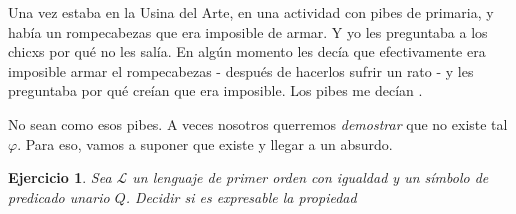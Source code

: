 \documentclass[10pt,a4paper]{article}
\def\l{\mathcal{L}}
\newtheorem{xca}{Ejercicio}
\begin{document}
\begin{anecdote}
Una vez estaba en la Usina del Arte, en una actividad con pibes de primaria, y había un rompecabezas que era imposible de armar. Y yo les preguntaba a los chicxs por qué no les salía. En algún momento les decía que efectivamente era imposible armar el rompecabezas - después de hacerlos sufrir un rato - y les preguntaba por qué creían que era imposible. Los pibes me decían .

No sean como esos pibes. A veces nosotros querremos \emph{demostrar } que no existe tal $\varphi$. Para eso, vamos a suponer que existe y llegar a un absurdo.
\end{anecdote} \bigskip

\begin{xca}Sea $\l$ un lenguaje de primer orden con igualdad y un símbolo de predicado unario $Q$. Decidir si es expresable la propiedad 
\end{xca}
\end{document}
